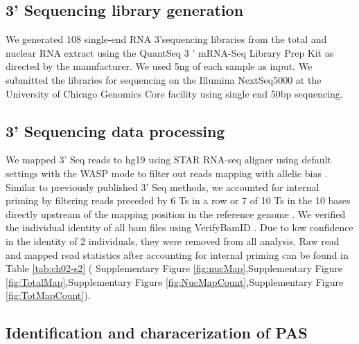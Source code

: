 \subsection{3' Sequencing library generation}\label{three-Sequencing-library-generation}

We generated 108 single-end RNA 3'sequencing libraries from the total and nuclear RNA extract using the QuantSeq 3 ' mRNA-Seq Library Prep Kit \citep{moll_quantseq_2014} as directed by the manufacturer. We used 5ng of each sample as input. We submitted the libraries for sequencing on the Illumina NextSeq5000 at the University of Chicago Genomics Core facility using single end 50bp sequencing. 

\subsection{3' Sequencing data processing}\label{three-Sequencing data processing}

We mapped 3'  Seq reads to hg19 \citep{church_modernizing_2011} using STAR RNA-seq aligner \citep{dobin_star_2013} using default settings with the WASP mode to filter out reads mapping with allelic bias \citep{van_de_geijn_wasp_2015}. Similar to previously published 3'  Seq methods, we accounted for internal priming by filtering reads preceded by 6 Ts in a row or 7 of 10 Ts in the 10 bases directly upstream of the mapping position in the reference genome \citep{tian_large-scale_2005, sheppard_accurate_2013, beaudoing_patterns_2000}. We verified the individual identity of all bam files using VerifyBamID \citep{jun_detecting_2012}. Due to low confidence in the identity of 2 individuals, they were removed from all analysis. Raw read and mapped read statistics after accounting for internal priming can be found in Table \ref{tab:ch02-s2} ( Supplementary Figure \ref{fig:nucMap},Supplementary Figure \ref{fig:TotalMap},Supplementary Figure \ref{fig:NucMapCount},Supplementary Figure \ref{fig:TotMapCount}).

\subsection{Identification and characerization of PAS}\label{Identification-and-characerization-of-PAS}


